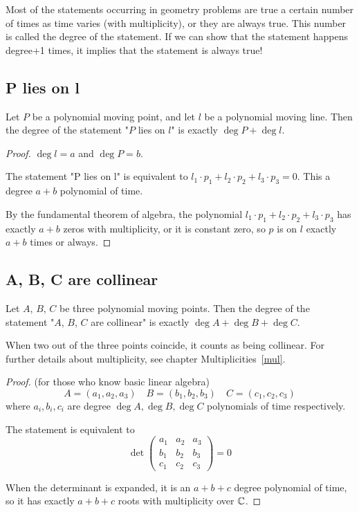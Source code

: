 \documentclass[a4paper]{article}
\begin{document}
Most of the statements occurring in geometry problems are true a certain number of times as time varies (with multiplicity), or they are always true. This number is called the degree of the statement. If we can show that the statement happens degree+1 times, it implies that the statement is always true!

\subsection{P lies on l}

\begin{theorem}\label{point-line}
    Let $P$ be a polynomial moving point, and let $l$ be a polynomial moving line. Then the degree of the statement "$P$ lies on $l$" is exactly $\deg P+ \deg l$. 
\end{theorem}
\begin{proof}
    $\deg l=a$ and $\deg P=b$.

    The statement "P lies on l" is equivalent to $l_1\cdot p_1+l_2\cdot p_2+l_3\cdot p_3=0$. This a degree $a+b$ polynomial of time.
    
    By the fundamental theorem of algebra, the polynomial $l_1\cdot p_1+l_2\cdot p_2+l_3\cdot p_3$ has exactly $a+b$ zeros with multiplicity, or it is constant zero, so $p$ is on $l$ exactly $a+b$ times or always.
\end{proof}
\subsection{A, B, C are collinear}
\begin{theorem}\label{deg3p}
    Let $A$, $B$, $C$ be three polynomial moving points. Then the degree of the statement "$A$, $B$, $C$ are collinear" is exactly $\deg A+ \deg B+ \deg C$.
\end{theorem}
\begin{remark}
    When two out of the three points coincide, it counts as being collinear. For further details about multiplicity, see chapter Multiplicities~\ref{mul}.
\end{remark}
\begin{proof}

(for those who know basic linear algebra)
\[
A = (a_1, a_2, a_3) \quad 
B = (b_1, b_2, b_3) \quad 
C = (c_1, c_2, c_3)
\]
where $a_i, b_i, c_i$ are degree $\deg A, \deg B, \deg C$ polynomials of time respectively.

    The statement is equivalent to
\[
\det \begin{pmatrix}
a_1 & a_2 & a_3 \\
b_1 & b_2 & b_3 \\
c_1 & c_2 & c_3
\end{pmatrix} = 0
\]

When the determinant is expanded, it is an $a+b+c$ degree polynomial of time, so it has exactly $a+b+c$ roots with multiplicity over $\mathbb{C}$.
\end{proof}
\end{document}
